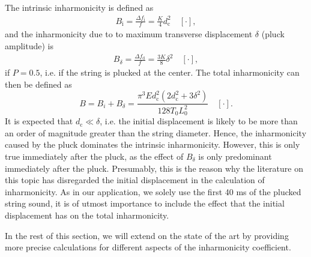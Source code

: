 \documentclass{article}
\begin{document}
\begin{sloppy}
\noindent The intrinsic inharmonicity is defined as
\begin{align}\label{eq:intrinsicInharmonicity}
    B_\text{i} = \frac {\Delta f_\text{i}}{f} = \frac {K}{4} d_\text{c}^2  \quad [\cdot],
\end{align}
and the inharmonicity due to to maximum transverse displacement $\delta$ (pluck amplitude) is  
\begin{align}
    B_\delta = \frac {\Delta f_\text{d}}{f} = \frac {3K}{8} \delta^2 \quad [\cdot],
\end{align}
if $P=0.5$, i.e. if the string is plucked at the center.
%
%
The total inharmonicity can then be defined as
\begin{equation}
    B =  B_i + B_\delta =  \frac{\pi^3 E d_\text{c}^2(2d_\text{c}^2 + 3\delta^2)}{128 T_0 L_0^2}\quad [\cdot].
\end{equation}
It is expected that $d_\text{c}\ll\delta$, i.e. the initial displacement is likely to be more than an order of magnitude greater than the string diameter. Hence, the inharmonicity caused by the pluck dominates the intrinsic inharmonicity. However, this is only true immediately after the pluck, as the effect of $B_\delta$ is only predominant immediately after the pluck. Presumably, this is the reason why the literature on this topic has disregarded the initial displacement in the calculation of inharmonicity. As in our application, we solely use the first 40 ms of the plucked string sound, it is of utmost importance to include the effect that the initial displacement has on the total inharmonicity.

In the rest of this section, we will extend on the state of the art by providing more precise calculations for different aspects of the inharmonicity coefficient.

\end{sloppy}
\end{document}
